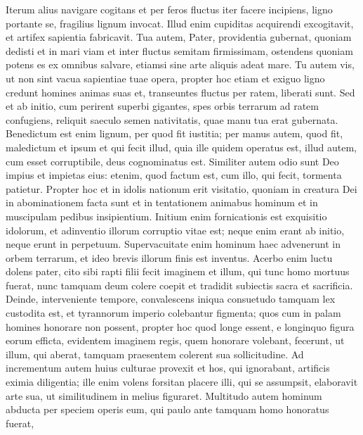\begin{biblechapter}
\begin{biblechapter}
\begin{biblechapter}
\begin{biblechapter}
\begin{biblechapter}
\begin{biblechapter}
\begin{biblechapter}
\begin{biblechapter}
\begin{biblechapter}
\begin{biblechapter}
\begin{biblechapter}
\begin{biblechapter}
\begin{biblechapter}
\begin{biblechapter}
\verse Iterum alius navigare cogitans
 et per feros fluctus iter facere incipiens,
 ligno portante se, fragilius lignum invocat.
 \verse Illud enim cupiditas acquirendi excogitavit,
 et artifex sapientia fabricavit.
 \verse Tua autem, Pater, providentia gubernat,
 quoniam dedisti et in mari viam
 et inter fluctus semitam firmissimam,
 \verse ostendens quoniam potens es ex omnibus salvare,
 etiamsi sine arte aliquis adeat mare.
 \verse Tu autem vis, ut non sint vacua sapientiae tuae opera,
 propter hoc etiam et exiguo ligno credunt homines animas suas
 et, transeuntes fluctus per ratem, liberati sunt.
 \verse Sed et ab initio, cum perirent superbi gigantes,
 spes orbis terrarum ad ratem confugiens,
 reliquit saeculo semen nativitatis,
 quae manu tua erat gubernata.
 \verse Benedictum est enim lignum, per quod fit iustitia;
 \verse per manus autem, quod fit, maledictum et ipsum et qui fecit illud,
 quia ille quidem operatus est,
 illud autem, cum esset corruptibile, deus cognominatus est.
 \verse Similiter autem odio sunt Deo impius et impietas eius:
 \verse etenim, quod factum est, cum illo, qui fecit, tormenta patietur.
 \verse Propter hoc et in idolis nationum erit visitatio,
 quoniam in creatura Dei in abominationem facta sunt
 et in tentationem animabus hominum
 et in muscipulam pedibus insipientium.
 \verse Initium enim fornicationis est exquisitio idolorum,
 et adinventio illorum corruptio vitae est;
 \verse neque enim erant ab initio, neque erunt in perpetuum.
 \verse Supervacuitate enim hominum haec advenerunt in orbem terrarum,
 et ideo brevis illorum finis est inventus.
 \verse Acerbo enim luctu dolens pater,
 cito sibi rapti filii fecit imaginem
 et illum, qui tunc homo mortuus fuerat,
 nunc tamquam deum colere coepit
 et tradidit subiectis sacra et sacrificia.
 \verse Deinde, interveniente tempore, convalescens iniqua consuetudo
 tamquam lex custodita est,
 et tyrannorum imperio colebantur figmenta;
 \verse quos cum in palam homines honorare non possent,
 propter hoc quod longe essent,
 e longinquo figura eorum efficta,
 evidentem imaginem regis, quem honorare volebant, fecerunt,
 ut illum, qui aberat, tamquam praesentem colerent sua sollicitudine.
 \verse Ad incrementum autem huius culturae
 provexit et hos, qui ignorabant, artificis eximia diligentia;
 \verse ille enim volens forsitan placere illi, qui se assumpsit,
 elaboravit arte sua, ut similitudinem in melius figuraret.
 \verse Multitudo autem hominum abducta per speciem operis
 eum, qui paulo ante tamquam homo honoratus fuerat,

\end{biblechapter}
\end{biblechapter}
\end{biblechapter}
\end{biblechapter}
\end{biblechapter}
\end{biblechapter}
\end{biblechapter}
\end{biblechapter}
\end{biblechapter}
\end{biblechapter}
\end{biblechapter}
\end{biblechapter}
\end{biblechapter}
\end{biblechapter}
